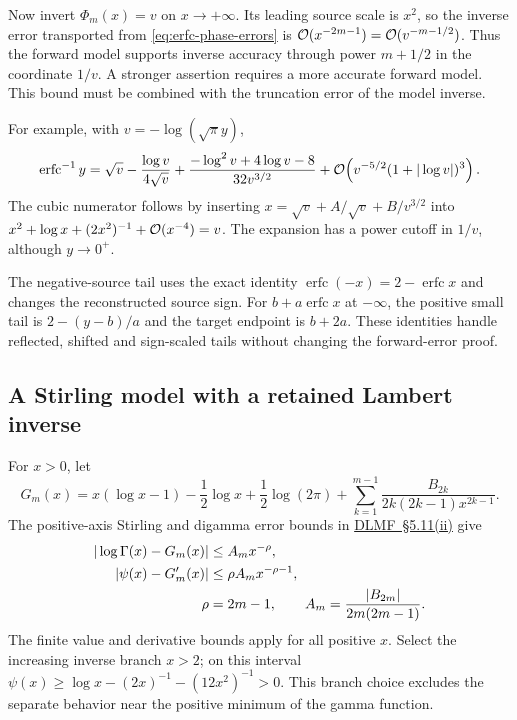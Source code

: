 Now invert $\Phi_m(x)=v$ on $x\to+\infty$. Its leading source scale is
$x^2$, so the inverse error transported from \eqref{eq:erfc-phase-errors}
is $\mathcal O(x^{-2m-1})=\mathcal O(v^{-m-1/2})$. Thus the forward model supports
inverse accuracy through power $m+1/2$ in the coordinate $1/v$.
A stronger assertion requires a more accurate forward model. This bound
must be combined with the truncation error of the model inverse.

For example, with $v=-\log(\sqrt\pi y)$,
\begin{equation}
 \operatorname{erfc}^{-1}y
 =\sqrt v-\frac{\log v}{4\sqrt v}
 +\frac{-\log^2v+4\log v-8}{32v^{3/2}}
 +\mathcal O\!\left(v^{-5/2}(1+|\log v|)^3\right).
 \label{eq:erfc-inverse-first-terms}
\end{equation}
The cubic numerator follows by inserting
$x=\sqrt v+A/\sqrt v+B/v^{3/2}$ into
$x^2+\log x+(2x^2)^{-1}+\mathcal O(x^{-4})=v$.
The expansion has a power cutoff in $1/v$, although $y\to0^+$.

The negative-source tail uses the exact identity
$\operatorname{erfc}(-x)=2-\operatorname{erfc}x$ and changes the
reconstructed source sign. For $b+a\operatorname{erfc}x$ at $-\infty$,
the positive small tail is $2-(y-b)/a$ and the target endpoint is $b+2a$.
These identities handle reflected, shifted and sign-scaled tails without
changing the forward-error proof.

\subsection{A Stirling model with a retained Lambert inverse}

For $x>0$, let
\begin{equation}
 G_m(x)=x(\log x-1)-\frac12\log x+\frac12\log(2\pi)
 +\sum_{k=1}^{m-1}\frac{B_{2k}}{2k(2k-1)x^{2k-1}}.
 \label{eq:stirling-finite-model}
\end{equation}
The positive-axis Stirling and digamma error bounds in
\href{https://dlmf.nist.gov/5.11.ii}{DLMF~\S5.11(ii)} give
\begin{align}
 |\log\Gamma(x)-G_m(x)|&\le A_mx^{-\rho},
 \label{eq:stirling-value-bound}\\
 |\psi(x)-G_m'(x)|&\le\rho A_mx^{-\rho-1},
 \label{eq:stirling-derivative-bound}\\
 \rho&=2m-1,\qquad
 A_m=\frac{|B_{2m}|}{2m(2m-1)}.
 \notag
\end{align}
The finite value and derivative bounds apply for all positive $x$.
Select the increasing inverse branch $x>2$; on this interval
$\psi(x)\ge\log x-(2x)^{-1}-(12x^2)^{-1}>0$.
This branch choice excludes the separate behavior near the positive
minimum of the gamma function.

